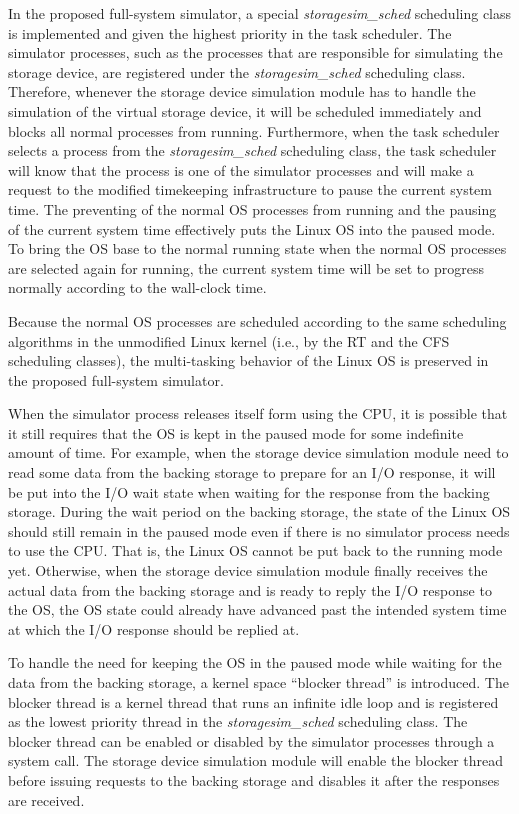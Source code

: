 In the proposed full-system simulator, a special \textit{storagesim_sched} scheduling class is implemented and given the highest priority in the task scheduler. The simulator processes, such as the processes that are responsible for simulating the storage device, are registered under the \textit{storagesim_sched} scheduling class. Therefore, whenever the storage device simulation module has to handle the simulation of the virtual storage device, it will be scheduled immediately and blocks all normal processes from running. Furthermore, when the task scheduler selects a process from the \textit{storagesim_sched} scheduling class, the task scheduler will know that the process is one of the simulator processes and will make a request to the modified timekeeping infrastructure to pause the current system time. The preventing of the normal OS processes from running and the pausing of the current system time effectively puts the Linux OS into the paused mode. To bring the OS base to the normal running state when the normal OS processes are selected again for running, the current system time will be set to progress normally according to the wall-clock time.

Because the normal OS processes are scheduled according to the same scheduling algorithms in the unmodified Linux kernel (i.e., by the RT and the CFS scheduling classes), the multi-tasking behavior of the Linux OS is preserved in the proposed full-system simulator.

When the simulator process releases itself form using the CPU, it is possible that it still requires that the OS is kept in the paused mode for some indefinite amount of time. For example, when the storage device simulation module need to read some data from the backing storage to prepare for an I/O response, it will be put into the I/O wait state when waiting for the response from the backing storage. During the wait period on the backing storage, the state of the Linux OS should still remain in the paused mode even if there is no simulator process needs to use the CPU. That is, the Linux OS cannot be put back to the running mode yet. Otherwise, when the storage device simulation module finally receives the actual data from the backing storage and is ready to reply the I/O response to the OS, the OS state could already have advanced past the intended system time at which the I/O response should be replied at.

To handle the need for keeping the OS in the paused mode while waiting for the data from the backing storage, a kernel space ``blocker thread'' is introduced. The blocker thread is a kernel thread that runs an infinite idle loop and is registered as the lowest priority thread in the \textit{storagesim_sched} scheduling class. The blocker thread can be enabled or disabled by the simulator processes through a system call. The storage device simulation module will enable the blocker thread before issuing requests to the backing storage and disables it after the responses are received.

